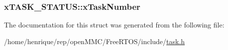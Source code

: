 \hypertarget{structxTASK__STATUS_acd44468ba37270b04f83d0833c098057}{
\subsubsection[{x\-Task\-Number}]{ x\-T\-A\-S\-K\-\_\-\-S\-T\-A\-T\-U\-S\-::x\-Task\-Number}}\label{structxTASK__STATUS_acd44468ba37270b04f83d0833c098057}


The documentation for this struct was generated from the following file\-:\begin{DoxyCompactItemize}
\item 
/home/henrique/rep/open\-M\-M\-C/\-Free\-R\-T\-O\-S/include/\hyperlink{task_8h}{task.\-h}\end{DoxyCompactItemize}
